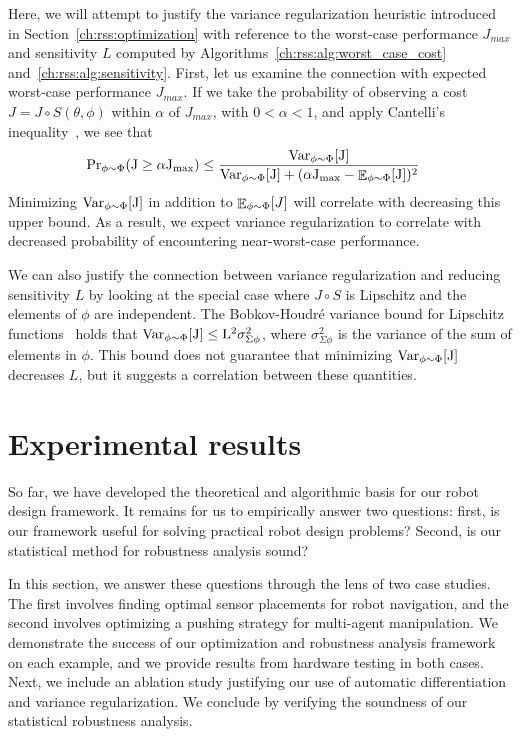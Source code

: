 Here, we will attempt to justify the variance regularization heuristic introduced in Section~\ref{ch:rss:optimization} with reference to the worst-case performance $J_{max}$ and sensitivity $L$ computed by Algorithms~\ref{ch:rss:alg:worst_case_cost} and~\ref{ch:rss:alg:sensitivity}. First, let us examine the connection with expected worst-case performance $J_{max}$. If we take the probability of observing a cost $J = J\circ S(\theta, \phi)$ within $\alpha$ of $J_{max}$, with $0 < \alpha < 1$, and apply Cantelli's inequality~\cite{boucheron_lugosi_massart_2016}, we see that
\begin{align*}
    \rm{Pr}_{\phi \sim \Phi}(J \geq \alpha J_{max}) & \leq \frac{\rm{Var}_{\phi \sim \Phi}[J]}{\rm{Var}_{\phi \sim \Phi}[J] + (\alpha J_{max} - \mathop{\mathbb{E}}_{\phi \sim \Phi}[J])^2}
\end{align*}
Minimizing $\rm{Var}_{\phi \sim \Phi}[J]$ in addition to $\mathop{\mathbb{E}}_{\phi \sim \Phi}[J]$ will correlate with decreasing this upper bound. As a result, we expect variance regularization to correlate with decreased probability of encountering near-worst-case performance.

We can also justify the connection between variance regularization and reducing sensitivity $L$ by looking at the special case where $J \circ S$ is Lipschitz and the elements of $\phi$ are independent. The Bobkov-Houdr\'e variance bound for Lipschitz functions~\cite{bobkov} holds that $\rm{Var}_{\phi \sim \Phi}[J] \leq L^2 \sigma_{\Sigma\phi}^2$,
where $\sigma_{\Sigma\phi}^2$ is the variance of the sum of elements in $\phi$. This bound does not guarantee that minimizing $\rm{Var}_{\phi \sim \Phi}[J]$ decreases $L$, but it suggests a correlation between these quantities.

\section{Experimental results}\label{ch:rss:cases}

So far, we have developed the theoretical and algorithmic basis for our robot design framework. It remains for us to empirically answer two questions: first, is our framework useful for solving practical robot design problems? Second, is our statistical method for robustness analysis sound?

In this section, we answer these questions through the lens of two case studies. The first involves finding optimal sensor placements for robot navigation, and the second involves optimizing a pushing strategy for multi-agent manipulation. We demonstrate the success of our optimization and robustness analysis framework on each example, and we provide results from hardware testing in both cases. Next, we include an ablation study justifying our use of automatic differentiation and variance regularization. We conclude by verifying the soundness of our statistical robustness analysis.

